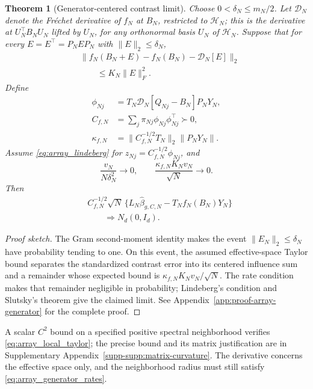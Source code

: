 \documentclass[pdflatex,iicol,sn-mathphys-ay]{sn-jnl}
\theoremstyle{thmstyleone}
\newtheorem{theorem}{Theorem}
\theoremstyle{thmstylethree}
\theoremstyle{thmstyletwo}
\begin{document}
\begin{theorem}[Generator-centered contrast limit]
\label{thm:array_generator_clt}
Choose \(0<\delta_N\le m_N/2\). Let \(\mathcal D_N\) denote the
Fr\'echet derivative of \(f_N\) at \(B_N\), restricted to
\(\mathcal H_N\); this is the derivative at \(U_N^\top B_NU_N\) lifted
by \(U_N\), for any orthonormal basis \(U_N\) of \(\mathcal H_N\).
Suppose that for every \(E=E^\top=P_NEP_N\) with
\(\|E\|_2\le\delta_N\),
\begin{equation}
 \begin{aligned}
 &\|f_N(B_N+E)-f_N(B_N)-\mathcal D_N[E]\|_2\\
 &\qquad\le K_N\|E\|_F^2.
 \end{aligned}
 \label{eq:array_local_taylor}
\end{equation}
Define
\[
 \begin{aligned}
 \phi_{Nj}&=T_N\mathcal D_N[Q_{Nj}-B_N]P_NY_N,\\
 C_{f,N}&=\sum_j\pi_{Nj}\phi_{Nj}\phi_{Nj}^\top\succ0,\\
 \kappa_{f,N}&=\|C_{f,N}^{-1/2}T_N\|_2\|P_NY_N\|.
 \end{aligned}
\]
Assume \eqref{eq:array_lindeberg} for
\(z_{Nj}=C_{f,N}^{-1/2}\phi_{Nj}\), and
\begin{equation}
 \frac{v_N}{N\delta_N^2}\longrightarrow0,\qquad
 \frac{\kappa_{f,N}K_Nv_N}{\sqrt N}\longrightarrow0 .
 \label{eq:array_generator_rates}
\end{equation}
Then
\[
 \begin{aligned}
 &C_{f,N}^{-1/2}\sqrt N\,
 \{L_N\widehat\beta_{g,C,N}-T_Nf_N(B_N)Y_N\}\\
 &\qquad\Longrightarrow N_d(0,I_d).
 \end{aligned}
\]
\end{theorem}
\begin{proof}[Proof sketch]
The Gram second-moment identity makes the event
$\|E_N\|_2\le\delta_N$ have probability tending to one. On this event,
the assumed effective-space Taylor bound separates the standardized
contrast error into its centered influence sum and a remainder whose
expected bound is $\kappa_{f,N}K_Nv_N/\sqrt N$.
The rate condition makes that remainder negligible in probability;
Lindeberg's condition and Slutsky's theorem give the claimed limit.
See Appendix~\ref{app:proof-array-generator} for the complete proof.
\end{proof}

A scalar $C^2$ bound on a specified positive spectral neighborhood verifies
\eqref{eq:array_local_taylor}; the precise bound and its matrix justification
are in Supplementary Appendix~\ref{supp-supp:matrix-curvature}.
The derivative concerns the effective space only, and the neighborhood
radius must still satisfy \eqref{eq:array_generator_rates}.
\end{document}
